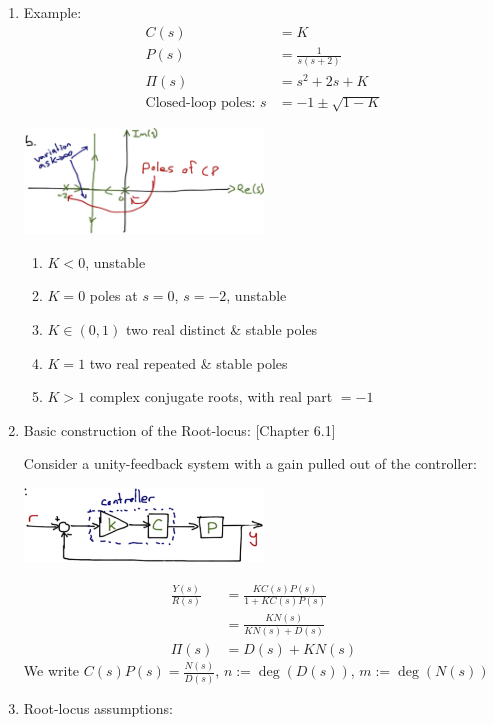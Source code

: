 \begin{enumerate}
\begin{enumerate}
            \item Example:
                \begin{align*}
                    C(s) &= K \\
                    P(s) &= \frac{1}{s(s+2)} \\
                    \Pi(s) &= s^2 + 2s + K \\
                    \text{Closed-loop poles: }s &= -1 \pm \sqrt{1 - K}
                \end{align*}
                \begin{center}\includegraphics[width=0.5\textwidth,keepaspectratio]{images/6-1-b.png}\end{center}
                \begin{enumerate}
                    \item $K< 0$, unstable
                    \item $K = 0$ poles at $s = 0$, $s = -2$, unstable
                    \item $K \in (0, 1)$ two real distinct \& stable poles
                    \item $K = 1$ two real repeated \& stable poles
                    \item $K > 1$ complex conjugate roots, with real part $= -1$
                \end{enumerate}

            \item Basic construction of the Root-locus: [Chapter 6.1]

                Consider a unity-feedback system with a gain pulled out of the controller:

                \begin{center}\includegraphics[width=0.5\textwidth,keepaspectratio]{images/6-1-c.png}\end{center}
                \begin{align*}
                    \frac{Y(s)}{R(s)} &= \frac{K C(s)P(s)}{1 + K C(s) P(s)} \\
                    &= \frac{K N(s)}{K N(s) + D(s)} \\
                    \Pi(s) &= D(s) + K N(s)
                \end{align*}
                We write $C(s)P(s) = \frac{N(s)}{D(s)}$, $n := \deg(D(s))$, $m := \deg(N(s))$
            \item Root-locus assumptions:


\end{enumerate}
\end{enumerate}
